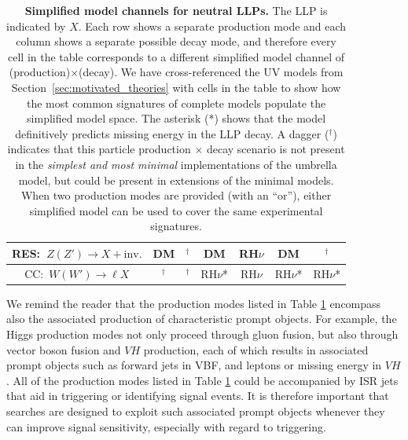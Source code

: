\begin{table}
\begin{center}
\begin{tabular}{ |c|c|c|c|c|c|c| }
 \hline 
 RES:~$Z(Z')\rightarrow X+\mathrm{inv.}$ & DM  & ${}^\dagger$ & DM &  RH$\nu$ & DM & ${}^\dagger$\\
  \hline
   CC:~$W(W')\rightarrow \ell X$ & ${}^\dagger$  & ${}^\dagger$ & RH$\nu$* & RH$\nu$ & RH$\nu$* & RH$\nu$* \\
  \hline
\end{tabular}
%
\end{center}
\caption{{\bf Simplified model channels for neutral LLPs.} The LLP is indicated by $X$. Each row shows a separate production mode and each column shows a separate possible decay mode, and therefore every cell in the table corresponds to a different simplified model channel of (production)$\times$(decay). We have cross-referenced the UV models from Section~\ref{sec:motivated_theories} with cells in the table to show how the most common signatures of complete models populate the simplified model space. The asterisk (*) shows that the model definitively predicts missing energy in the LLP decay. A dagger (${}^\dagger$) indicates that this particle production $\times$ decay scenario is not present in the \emph{simplest and most minimal} implementations of the umbrella model, but could be present in extensions of the minimal models. When two production modes are provided (with an ``or''), either simplified model can be used to cover the same experimental signatures.  }\label{tab:neutral_LLP}
\end{table}

We remind the reader that the production modes listed in Table
\ref{tab:neutral_LLP} encompass also the associated production of
characteristic prompt objects. For example, the Higgs production modes
not only proceed through gluon fusion, but also through vector boson
fusion and $VH$ production, each of which results in associated prompt
objects such as forward jets in VBF, and leptons or missing
energy in $VH$. All of the production modes listed in Table
\ref{tab:neutral_LLP} could be accompanied by ISR jets that aid in
triggering or identifying signal events. It is therefore important
that searches are designed to exploit such associated prompt objects
whenever they can improve signal sensitivity, especially with regard to triggering.


